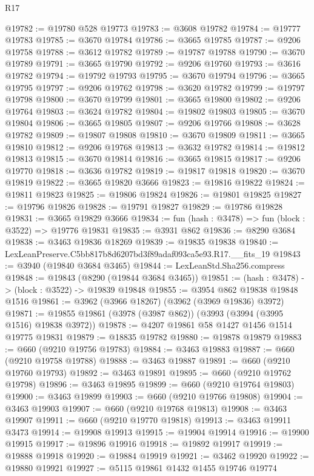 \begin{lexlean}{R17}
\begin{coremodule}
@19782 := @19780 @528 @19773
@19783 := @3608 @19782
@19784 := @19777 @19783
@19785 := @3670 @19784
@19786 := @3665 @19785
@19787 := @9206 @19758
@19788 := @3612 @19782
@19789 := @19787 @19788
@19790 := @3670 @19789
@19791 := @3665 @19790
@19792 := @9206 @19760
@19793 := @3616 @19782
@19794 := @19792 @19793
@19795 := @3670 @19794
@19796 := @3665 @19795
@19797 := @9206 @19762
@19798 := @3620 @19782
@19799 := @19797 @19798
@19800 := @3670 @19799
@19801 := @3665 @19800
@19802 := @9206 @19764
@19803 := @3624 @19782
@19804 := @19802 @19803
@19805 := @3670 @19804
@19806 := @3665 @19805
@19807 := @9206 @19766
@19808 := @3628 @19782
@19809 := @19807 @19808
@19810 := @3670 @19809
@19811 := @3665 @19810
@19812 := @9206 @19768
@19813 := @3632 @19782
@19814 := @19812 @19813
@19815 := @3670 @19814
@19816 := @3665 @19815
@19817 := @9206 @19770
@19818 := @3636 @19782
@19819 := @19817 @19818
@19820 := @3670 @19819
@19822 := @3665 @19820 @3666
@19823 := @19816 @19822
@19824 := @19811 @19823
@19825 := @19806 @19824
@19826 := @19801 @19825
@19827 := @19796 @19826
@19828 := @19791 @19827
@19829 := @19786 @19828
@19831 := @3665 @19829 @3666
@19834 := fun (hash : @3478) => fun (block : @3522) => @19776 @19831
@19835 := @3931 @862
@19836 := @8290 @3684
@19838 := @3463 @19836 @18269
@19839 := @19835 @19838
@19840 := LexLeanPreserve.C5bb817b8d6207bd3f89adaf093ca5e93.R17.__fits_19
@19843 := @3940 (@19840 @3684 @3465)
@19844 := LexLeanStd.Sha256.compress
@19848 := @19843 (@8290 (@19844 @3684 @3465))
@19851 := (hash : @3478) -> (block : @3522) -> @19839 @19848
@19855 := @3954 @862 @19838 @19848 @1516
@19861 := @3962 (@3966 @18267) (@3962 (@3969 @19836) @3972)
@19871 := @19855 @19861 (@3978 (@3987 @862)) (@3993 (@3994 (@3995 @1516) @19838 @3972))
@19878 := @4207 @19861 @58 @1427 @1456 @1514 @19775 @19831
@19879 := @18835 @19782
@19880 := @19878 @19879
@19883 := @660 (@9210 @19756 @19783)
@19884 := @3463 @19883
@19887 := @660 (@9210 @19758 @19788)
@19888 := @3463 @19887
@19891 := @660 (@9210 @19760 @19793)
@19892 := @3463 @19891
@19895 := @660 (@9210 @19762 @19798)
@19896 := @3463 @19895
@19899 := @660 (@9210 @19764 @19803)
@19900 := @3463 @19899
@19903 := @660 (@9210 @19766 @19808)
@19904 := @3463 @19903
@19907 := @660 (@9210 @19768 @19813)
@19908 := @3463 @19907
@19911 := @660 (@9210 @19770 @19818)
@19913 := @3463 @19911 @3473
@19914 := @19908 @19913
@19915 := @19904 @19914
@19916 := @19900 @19915
@19917 := @19896 @19916
@19918 := @19892 @19917
@19919 := @19888 @19918
@19920 := @19884 @19919
@19921 := @3462 @19920
@19922 := @19880 @19921
@19927 := @5115 @19861 @1432 @1455 @19746 @19774

\end{coremodule}
\end{lexlean}
